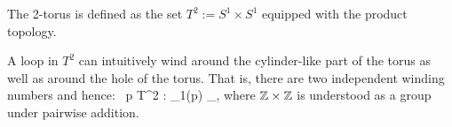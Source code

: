 \be
The 2-torus is defined as the set $T^2:=S^1\times S^1$ equipped with the product topology.
\begin{center}
\end{center}
A loop in $T^2$ can intuitively wind around the cylinder-like part of the torus as well as around the hole of the torus. That is, there are two independent winding numbers and hence:
\bse
\forall \, p \in T^2 : \pi_1(p) \cong_\Z\times \Z,
\ese
where $\mathbb{Z}\times \mathbb{Z}$ is understood as a group under pairwise addition.
\ee
